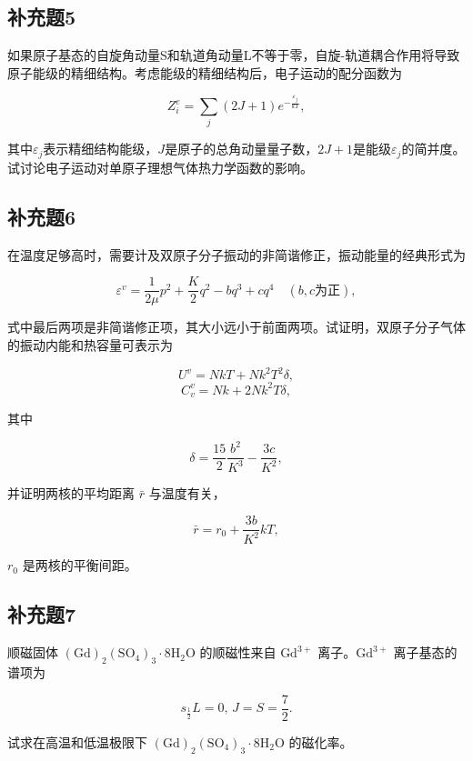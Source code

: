 \newpage
\subsection{补充题5}
如果原子基态的自旋角动量S和轨道角动量L不等于零，自旋-轨道耦合作用将导致原子能级的精细结构。考虑能级的精细结构后，电子运动的配分函数为

$$ Z_i^e = \sum_j (2J+1) e^{-\frac{\varepsilon_j}{kT}}, $$

其中$\varepsilon_j$表示精细结构能级，$J$是原子的总角动量量子数，$2J+1$是能级$\varepsilon_j$的简并度。试讨论电子运动对单原子理想气体热力学函数的影响。

\newpage
\subsection{补充题6}
在温度足够高时，需要计及双原子分子振动的非简谐修正，振动能量的经典形式为

$$ \varepsilon^v = \frac{1}{2\mu} p^2 + \frac{K}{2} q^2 - bq^3 + cq^4 \quad (b, c 为正), $$

式中最后两项是非简谐修正项，其大小远小于前面两项。试证明，双原子分子气体的振动内能和热容量可表示为

$$ U^v = NkT + Nk^2 T^2 \delta, $$
$$ C_v^v = Nk + 2Nk^2 T \delta, $$

其中

$$ \delta = \frac{15}{2} \frac{b^2}{K^3} - \frac{3c}{K^2}, $$

并证明两核的平均距离 $\bar{r}$ 与温度有关，

$$ \bar{r} = r_0 + \frac{3b}{K^2} kT, $$

$r_0$ 是两核的平衡间距。

\newpage
\subsection{补充题7}
顺磁固体 $(\text{Gd})_2 (\text{SO}_4)_3 \cdot 8\text{H}_2\text{O}$ 的顺磁性来自 $\text{Gd}^{3+}$ 离子。$\text{Gd}^{3+}$ 离子基态的谱项为

$$ s_{\frac{1}{2}} L = 0, \, J = S = \frac{7}{2}. $$

试求在高温和低温极限下 $(\text{Gd})_2 (\text{SO}_4)_3 \cdot 8\text{H}_2\text{O}$ 的磁化率。